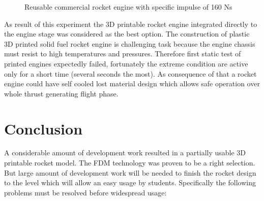 \documentclass{poster16}
\begin{document}
\begin{figure}[ht]
\begin{center}
\caption{Reusable commercial rocket engine with specific impulse of 160 Ns} 
\label{fig:metal_engine}
\end{center}
\end{figure}

As result of this experiment the 3D printable rocket engine integrated directly to the engine stage was considered as the best option. The construction of plastic 3D printed solid fuel rocket engine is challenging task because the engine chassis must resist to high temperatures and pressures. Therefore first static test of printed engines expectedly failed, fortunately the extreme condition are active only for a short time (several seconds the most). As consequence of that a rocket engine could have self cooled lost material design which allows safe operation over whole thrust generating flight phase. 


\section{Conclusion}

A considerable amount of development work resulted in a partially usable 3D printable rocket model. The FDM technology was proven to be a right selection. But large amount of development work will be needed to finish the rocket design to the level which will allow an easy usage by students. 
Specifically the following problems must be resolved before widespread usage: 
\end{document}

